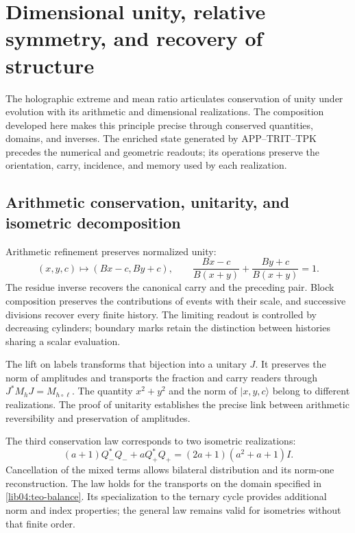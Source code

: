 \section{Dimensional unity, relative symmetry, and recovery of structure}
\label{lib06:sintesis}

The holographic extreme and mean ratio articulates conservation of unity
under evolution with its arithmetic and dimensional realizations. The
composition developed here makes this principle precise through
conserved quantities, domains, and inverses. The enriched state
generated by APP--TRIT--TPK precedes the numerical and
geometric readouts; its operations preserve the orientation, carry,
incidence, and memory used by each realization.

\subsection{Arithmetic conservation, unitarity, and isometric decomposition}
\label{lib06:tres-conservaciones}

Arithmetic refinement preserves normalized unity:
\begin{equation}
 (x,y,c)\longmapsto(Bx-c,By+c),\qquad
 \frac{Bx-c}{B(x+y)}+\frac{By+c}{B(x+y)}=1.
 \label{lib06:unidad}
\end{equation}
The residue inverse recovers the canonical carry and the preceding
pair. Block composition preserves the contributions of
events with their scale, and successive divisions recover every
finite history. The limiting readout is controlled by decreasing
cylinders; boundary marks retain the distinction between
histories sharing a scalar evaluation.

The lift on labels transforms that bijection into a
unitary \(J\). It preserves the norm of amplitudes and transports
the fraction and carry readers through
\(J^*M_hJ=M_{h\circ\ell}\). The quantity \(x^2+y^2\) and the norm
of \(|x,y,c\rangle\) belong to different realizations. The
proof of unitarity establishes the precise link between arithmetic
reversibility and preservation of amplitudes.

The third conservation law corresponds to two isometric realizations:
\begin{equation}
 (a+1)Q_-^*Q_-+aQ_+^*Q_+
 =(2a+1)(a^2+a+1)I.
 \label{lib06:balance}
\end{equation}
Cancellation of the mixed terms allows bilateral
distribution and its norm-one reconstruction. The law holds for the
transports on the domain specified in
\cref{lib04:teo-balance}. Its specialization to the ternary cycle
provides additional norm and index properties; the general law
remains valid for isometries without that finite order.


